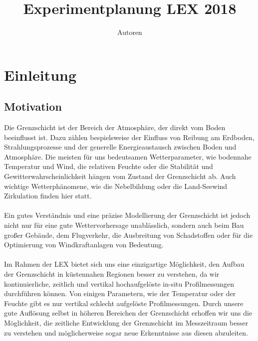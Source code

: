 \documentclass[a4paper,11pt,DIV=calc,tablecaptionabove,headinclude,twoside]{article}
\title{Experimentplanung LEX 2018}%
\author{Autoren}
\begin{document}
\maketitle



\section{Einleitung}
\subsection{Motivation}
Die Grenzschicht ist der Bereich der Atmosphäre, der direkt vom Boden beeinflusst ist. Dazu zählen bespielsweise der Einfluss von Reibung am Erdboden, Strahlungsprozesse und der generelle Energieaustausch zwischen Boden und Atmosphäre. Die meisten für uns bedeutsamen Wetterparameter, wie bodennahe Temperatur und Wind, die relativen Feuchte oder die Stabilität und Gewitterwahrscheinlichkeit hängen vom Zustand der Grenzschicht ab. Auch wichtige Wetterphänomene, wie die Nebelbildung oder die Land-Seewind Zirkulation finden hier statt.\\\\
Ein gutes Verständnis und eine präzise Modellierung der Grenzschicht ist jedoch nicht nur für eine gute Wettervorhersage unablässlich, sondern auch beim Bau großer Gebäude, dem Flugverkehr, die Ausbreitung von Schadstoffen oder für die Optimierung von Windkraftanlagen von Bedeutung.\\\\
Im Rahmen der LEX bietet sich uns eine einzigartige Möglichkeit, den Aufbau der Grenzschicht in küstennahen Regionen besser zu verstehen, da wir kontinuierliche, zeitlich und vertikal hochaufgelöste in-situ Profilmessungen durchführen können. Von einigen Parametern, wie der Temperatur oder der Feuchte gibt es nur vertikal schlecht aufgelöste Profilmessungen. Durch unsere gute Auflösung selbst in höheren Bereichen der Grenzschicht erhoffen wir uns die Möglichkeit, die zeitliche Entwicklung der Grenzschicht im Messzeitraum besser zu verstehen und möglicherweise sogar neue Erkenntnisse aus diesen abzuleiten.
\end{document}
